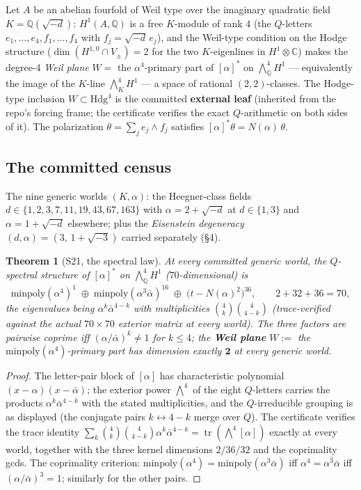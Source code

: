 \documentclass[11pt]{article}
\newtheorem{theorem}{Theorem}[section]
\begin{document}
Let $A$ be an abelian fourfold of Weil type over the imaginary quadratic
field $K = \mathbb{Q}(\sqrt{-d})$: $H^1(A,\mathbb{Q})$ is a free
$K$-module of rank $4$ (the $Q$-letters $e_1,\dots,e_4,f_1,\dots,f_4$ with
$f_j = \sqrt{-d}\,e_j$), and the Weil-type condition on the Hodge structure
($\dim(H^{1,0} \cap V_\pm) = 2$ for the two $K$-eigenlines in
$H^1 \otimes \mathbb{C}$) makes the degree-4 \emph{Weil plane}
$W = $ the $\alpha^4$-primary part of $[\alpha]^*$ on
$\bigwedge^4_\mathbb{Q} H^1$ --- equivalently the image of the $K$-line
$\bigwedge^4_K H^1$ --- a space of rational $(2,2)$-classes. The Hodge-type
inclusion $W \subset \mathrm{Hdg}^4$ is the committed \textbf{external leaf}
(inherited from the repo's forcing frame; the certificate verifies the exact
$Q$-arithmetic on both sides of it). The polarization
$\theta = \sum_j e_j \wedge f_j$ satisfies
$[\alpha]^*\theta = N(\alpha)\,\theta$.

\subsection{The committed census}

The nine generic worlds $(K, \alpha)$: the Heegner-class fields
$d \in \{1,2,3,7,11,19,43,67,163\}$ with $\alpha = 2 + \sqrt{-d}$ at
$d \in \{1,3\}$ and $\alpha = 1 + \sqrt{-d}$ elsewhere; plus the
\emph{Eisenstein degeneracy} $(d,\alpha) = (3,\,1+\sqrt{-3})$ carried
separately (\S4).

\begin{theorem}[S21, the spectral law]\label{thm:s21}
At every committed generic world, the $Q$-spectral structure of $[\alpha]^*$
on $\bigwedge^4_\mathbb{Q}H^1$ ($70$-dimensional) is
\[
\mathrm{minpoly}(\alpha^4)^{1}\;\oplus\;
\mathrm{minpoly}(\alpha^3\bar\alpha)^{16}\;\oplus\;
\big(t - N(\alpha)^2\big)^{36},
\qquad 2 + 32 + 36 = 70,
\]
the eigenvalues being $\alpha^k\bar\alpha^{4-k}$ with multiplicities
$\binom{4}{k}\binom{4}{4-k}$ (trace-verified against the actual $70\times70$
exterior matrix at every world). The three factors are pairwise coprime
iff $(\alpha/\bar\alpha)^k \ne 1$ for $k \le 4$; the \textbf{Weil plane}
$W := $ the $\mathrm{minpoly}(\alpha^4)$-primary part has dimension exactly
$\mathbf{2}$ at every generic world.
\end{theorem}

\begin{proof}
The letter-pair block of $[\alpha]$ has characteristic polynomial
$(x-\alpha)(x-\bar\alpha)$; the exterior power
$\bigwedge^4$ of the eight $Q$-letters carries the products
$\alpha^k\bar\alpha^{4-k}$ with the stated multiplicities, and the
$Q$-irreducible grouping is as displayed (the conjugate pairs
$k \leftrightarrow 4-k$ merge over $Q$). The certificate verifies the
trace identity
$\sum_k \binom{4}{k}\binom{4}{4-k}\alpha^k\bar\alpha^{4-k}
= \operatorname{tr}(\bigwedge^4[\alpha])$
exactly at every world, together with the three kernel dimensions
$2/36/32$ and the coprimality gcds. The coprimality criterion:
$\mathrm{minpoly}(\alpha^4) = \mathrm{minpoly}(\alpha^3\bar\alpha)$
iff $\alpha^4 = \overline{\alpha^3\bar\alpha}$ iff
$(\alpha/\bar\alpha)^3 = 1$; similarly for the other pairs.
\end{proof}
\end{document}
